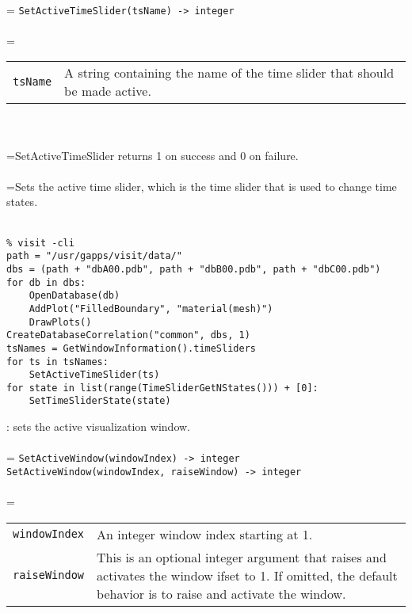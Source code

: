 \documentclass[10pt,a4paper]{report}
\begin{document}
 \\ 
\hangindent=\parindent 
\verb!SetActiveTimeSlider(tsName) -> integer!\\ [-3mm]

 \\ 
\hangindent=\parindent 
\begin{tabular}{lp{9cm}}
\verb!tsName! & A string containing the name of the time slider that should be made active. \\
\end{tabular} \\[-2mm]


 \\ 
\hangindent=\parindent SetActiveTimeSlider returns 1 on success and 0 on failure. \\[-3mm] 

 \\ 
\hangindent=\parindent Sets the active time slider, which is the time slider that is used to change time states. \\[-3mm] 

\\[-6mm]
\begin{verbatim}% visit -cli
path = "/usr/gapps/visit/data/"
dbs = (path + "dbA00.pdb", path + "dbB00.pdb", path + "dbC00.pdb")
for db in dbs:
    OpenDatabase(db)
    AddPlot("FilledBoundary", "material(mesh)")
    DrawPlots()
CreateDatabaseCorrelation("common", dbs, 1)
tsNames = GetWindowInformation().timeSliders
for ts in tsNames:
    SetActiveTimeSlider(ts)
for state in list(range(TimeSliderGetNStates())) + [0]:
    SetTimeSliderState(state)
\end{verbatim}
\newpage


{}
: sets the active visualization window.\\[-3mm]

 \\ 
\hangindent=\parindent 
\verb!SetActiveWindow(windowIndex) -> integer!\\ 
\verb!SetActiveWindow(windowIndex, raiseWindow) -> integer!\\ [-3mm]

 \\ 
\hangindent=\parindent 
\begin{tabular}{lp{9cm}}
\verb!windowIndex! & An integer window index starting at 1. \\
\verb!raiseWindow! & This is an optional integer argument that raises and activates the window ifset to 1. If omitted, the default behavior is to raise and activate the window. \\
\end{tabular} \\[-2mm]
\end{document}
